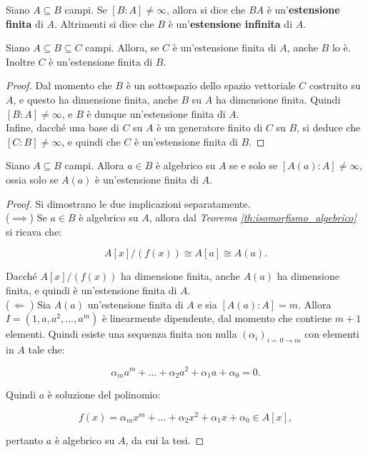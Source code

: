 \documentclass[11pt]{scrbook}
\begin{document}
\begin{definition}
    Siano $A \subseteq B$ campi. Se $[B : A] \neq \infty$, allora
    si dice che $BA$ è un'\textbf{estensione finita} di $A$.
    Altrimenti si dice che $B$ è un'\textbf{estensione infinita}
    di $A$.
\end{definition}

\begin{proposition}
    \label{prop:estensione_finita}
    Siano $A \subseteq B \subseteq C$ campi. Allora, se $C$ è
    un'estensione finita di $A$, anche $B$ lo è. Inoltre
    $C$ è un'estensione finita di $B$.
\end{proposition}

\begin{proof}
    Dal momento che $B$ è un sottospazio dello spazio vettoriale
    $C$ costruito su $A$, e questo ha dimensione finita,
    anche $B$ su $A$ ha dimensione finita. Quindi $[B : A] \neq
        \infty$, e $B$ è dunque un'estensione finita di $A$. \\

    Infine, dacché una base di $C$ su $A$ è un generatore finito
    di $C$ su $B$, si deduce che $[C : B] \neq \infty$, e quindi
    che $C$ è un'estensione finita di $B$.
\end{proof}

\begin{theorem}
    \label{th:estensione_algebrica}
    Siano $A \subseteq B$ campi. Allora $a \in B$ è
    algebrico su $A$ se e solo se $[A(a) : A] \neq \infty$,
    ossia solo se $A(a)$ è un'estensione finita di $A$.
\end{theorem}

\begin{proof} Si dimostrano le due implicazioni separatamente. \\

    ($\implies$)\; Se $a \in B$ è algebrico su $A$, allora
    dal \textit{Teorema \ref{th:isomorfismo_algebrico}} si ricava che:

    \[ A[x]/(f(x)) \cong A[a] \cong A(a). \]

    \vskip 0.1in

    Dacché $A[x]/(f(x))$ ha dimensione finita, anche $A(a)$
    ha dimensione finita, e quindi è un'estensione finita
    di $A$. \\

    ($\,\Longleftarrow\,\,$)\; Sia $A(a)$ un'estensione
    finita di $A$ e sia $[A(a) : A]=m$. Allora $I=(1, a, a^2, \ldots, a^m)$ è linearmente dipendente, dal momento che contiene
    $m+1$ elementi. Quindi esiste una sequenza finita non nulla
    $(\alpha_i)_{i=\,0\to m}$ con elementi in $A$ tale che:

    \[ \alpha_m a^m + \ldots + \alpha_2 a^2 + \alpha_1 a + \alpha_0 = 0. \]

    Quindi $a$ è soluzione del polinomio:

    \[ f(x) = \alpha_m x^m + \ldots + \alpha_2 x^2 + \alpha_1 x + \alpha_0 \in A[x], \]

    \vskip 0.1in

    pertanto $a$ è algebrico su $A$, da cui la tesi.
\end{proof}
\end{document}
